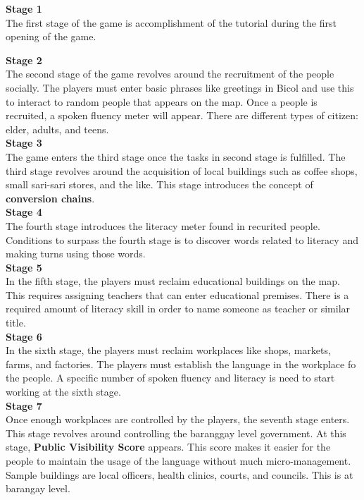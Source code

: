 \documentclass[11pt]{article}
\begin{document}
\textbf{Stage 1}\\
The first stage of the game is accomplishment of the tutorial during the first opening of the game.

\textbf{Stage 2}\\
The second stage of the game revolves around the recruitment of the people socially. The players must enter basic phrases like greetings in Bicol and use this to interact to random people that appears on the map. Once a people is recruited, a spoken fluency meter will appear.
There are different types of citizen: elder, adults, and teens.\\

\textbf{Stage 3}\\
The game enters the third stage once the tasks in second stage is fulfilled. The third stage revolves around the acquisition of local buildings such as coffee shops, small sari-sari stores, and the like. This stage introduces the concept of \textbf{conversion chains}.\\

\textbf{Stage 4}\\
The fourth stage introduces the literacy meter found in recurited people. Conditions to surpass the fourth stage is to discover words related to literacy and making turns using those words.\\

\textbf{Stage 5}\\
In the fifth stage, the players must reclaim educational buildings on the map. This requires assigning teachers that can enter educational premises. There is a required amount of literacy skill in order to name someone as teacher or similar title.\\

\textbf{Stage 6}\\
In the sixth stage, the players must reclaim workplaces like shops, markets, farms, and factories. The players must establish the language in the workplace fo the people. A specific number of spoken fluency and literacy is need to start working at the sixth stage.\\

\textbf{Stage 7}\\
Once enough workplaces are controlled by the players, the seventh stage enters. This stage revolves around controlling the baranggay level government. At this stage, \textbf{Public Visibility Score} appears. This score makes it easier for the people to maintain the usage of the language without much micro-management. Sample buildings are local officers, health clinics, courts, and councils. This is at barangay level.\\
\end{document}
